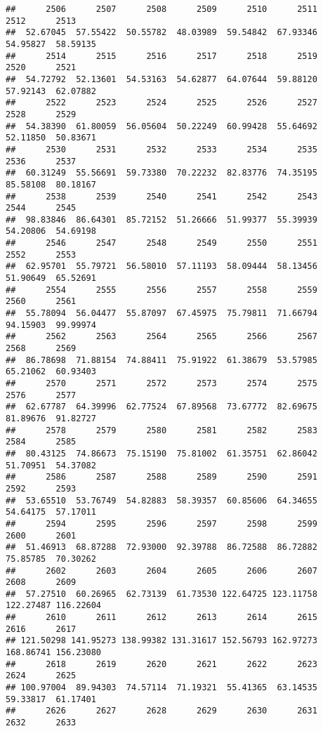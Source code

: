 \documentclass[
]{article}
\begin{document}
\begin{verbatim}
##      2506      2507      2508      2509      2510      2511      2512      2513 
##  52.67045  57.55422  50.55782  48.03989  59.54842  67.93346  54.95827  58.59135 
##      2514      2515      2516      2517      2518      2519      2520      2521 
##  54.72792  52.13601  54.53163  54.62877  64.07644  59.88120  57.92143  62.07882 
##      2522      2523      2524      2525      2526      2527      2528      2529 
##  54.38390  61.80059  56.05604  50.22249  60.99428  55.64692  52.11850  50.83671 
##      2530      2531      2532      2533      2534      2535      2536      2537 
##  60.31249  55.56691  59.73380  70.22232  82.83776  74.35195  85.58108  80.18167 
##      2538      2539      2540      2541      2542      2543      2544      2545 
##  98.83846  86.64301  85.72152  51.26666  51.99377  55.39939  54.20806  54.69198 
##      2546      2547      2548      2549      2550      2551      2552      2553 
##  62.95701  55.79721  56.58010  57.11193  58.09444  58.13456  51.90649  65.52691 
##      2554      2555      2556      2557      2558      2559      2560      2561 
##  55.78094  56.04477  55.87097  67.45975  75.79811  71.66794  94.15903  99.99974 
##      2562      2563      2564      2565      2566      2567      2568      2569 
##  86.78698  71.88154  74.88411  75.91922  61.38679  53.57985  65.21062  60.93403 
##      2570      2571      2572      2573      2574      2575      2576      2577 
##  62.67787  64.39996  62.77524  67.89568  73.67772  82.69675  81.89676  91.82727 
##      2578      2579      2580      2581      2582      2583      2584      2585 
##  80.43125  74.86673  75.15190  75.81002  61.35751  62.86042  51.70951  54.37082 
##      2586      2587      2588      2589      2590      2591      2592      2593 
##  53.65510  53.76749  54.82883  58.39357  60.85606  64.34655  54.64175  57.17011 
##      2594      2595      2596      2597      2598      2599      2600      2601 
##  51.46913  68.87288  72.93000  92.39788  86.72588  86.72882  75.85785  70.30262 
##      2602      2603      2604      2605      2606      2607      2608      2609 
##  57.27510  60.26965  62.73139  61.73530 122.64725 123.11758 122.27487 116.22604 
##      2610      2611      2612      2613      2614      2615      2616      2617 
## 121.50298 141.95273 138.99382 131.31617 152.56793 162.97273 168.86741 156.23080 
##      2618      2619      2620      2621      2622      2623      2624      2625 
## 100.97004  89.94303  74.57114  71.19321  55.41365  63.14535  59.33817  61.17401 
##      2626      2627      2628      2629      2630      2631      2632      2633 

\end{verbatim}
\end{document}
